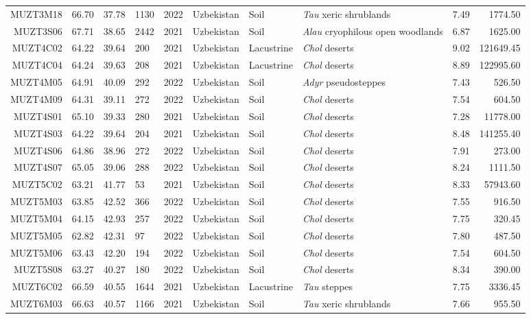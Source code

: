 \begin{table}[ht]
\begin{tabular}{rrrlrlllrr}
  MUZT3M18 & 66.70 & 37.78 & 1130 & 2022 & Uzbekistan & Soil & \textit{Tau} xeric shrublands & 7.49 & 1774.50 \\ 
  MUZT3S06 & 67.71 & 38.65 & 2442 & 2021 & Uzbekistan & Soil & \textit{Alau} cryophilous open woodlands & 6.87 & 1625.00 \\ 
  MUZT4C02 & 64.22 & 39.64 & 200 & 2021 & Uzbekistan & Lacustrine & \textit{Chol} deserts & 9.02 & 121649.45 \\ 
  MUZT4C04 & 64.24 & 39.63 & 208 & 2021 & Uzbekistan & Lacustrine & \textit{Chol} deserts & 8.89 & 122995.60 \\ 
  MUZT4M05 & 64.91 & 40.09 & 292 & 2022 & Uzbekistan & Soil & \textit{Adyr} pseudosteppes & 7.43 & 526.50 \\ 
  MUZT4M09 & 64.31 & 39.11 & 272 & 2022 & Uzbekistan & Soil & \textit{Chol} deserts & 7.54 & 604.50 \\ 
  MUZT4S01 & 65.10 & 39.33 & 280 & 2021 & Uzbekistan & Soil & \textit{Chol} deserts & 7.28 & 11778.00 \\ 
  MUZT4S03 & 64.22 & 39.64 & 204 & 2021 & Uzbekistan & Soil & \textit{Chol} deserts & 8.48 & 141255.40 \\ 
  MUZT4S06 & 64.86 & 38.96 & 272 & 2022 & Uzbekistan & Soil & \textit{Chol} deserts & 7.91 & 273.00 \\ 
  MUZT4S07 & 65.05 & 39.06 & 288 & 2022 & Uzbekistan & Soil & \textit{Chol} deserts & 8.24 & 1111.50 \\ 
  MUZT5C02 & 63.21 & 41.77 & 53 & 2021 & Uzbekistan & Soil & \textit{Chol} deserts & 8.33 & 57943.60 \\ 
  MUZT5M03 & 63.85 & 42.52 & 366 & 2022 & Uzbekistan & Soil & \textit{Chol} deserts & 7.55 & 916.50 \\ 
  MUZT5M04 & 64.15 & 42.93 & 257 & 2022 & Uzbekistan & Soil & \textit{Chol} deserts & 7.75 & 320.45 \\ 
  MUZT5M05 & 62.82 & 42.31 & 97 & 2022 & Uzbekistan & Soil & \textit{Chol} deserts & 7.80 & 487.50 \\ 
  MUZT5M06 & 63.43 & 42.20 & 194 & 2022 & Uzbekistan & Soil & \textit{Chol} deserts & 7.54 & 604.50 \\ 
  MUZT5S08 & 63.27 & 40.27 & 180 & 2022 & Uzbekistan & Soil & \textit{Chol} deserts & 8.34 & 390.00 \\ 
  MUZT6C02 & 66.59 & 40.55 & 1644 & 2021 & Uzbekistan & Lacustrine & \textit{Tau} steppes & 7.75 & 3336.45 \\ 
  MUZT6M03 & 66.63 & 40.57 & 1166 & 2021 & Uzbekistan & Soil & \textit{Tau} xeric shrublands & 7.66 & 955.50 \\ 

\end{tabular}
\end{table}
